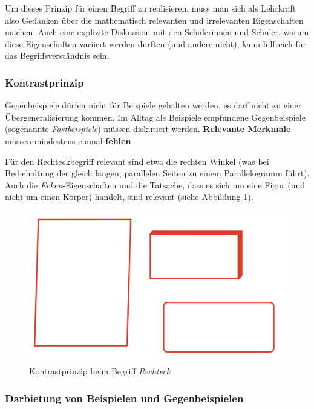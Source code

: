 \documentclass[
  ngerman,
]{scrbook}
\theoremstyle{definition}
\theoremstyle{definition}
\theoremstyle{definition}
\theoremstyle{definition}
\theoremstyle{remark}
\begin{document}
Um dieses Prinzip für einen Begriff zu realisieren, muss man sich als Lehrkraft also Gedanken über die mathematisch relevanten und irrelevanten Eigenschaften machen. Auch eine explizite Diskussion mit den Schülerinnen und Schüler, warum diese Eigenschaften variiert werden durften (und andere nicht), kann hilfreich für das Begriffsverständnis sein.

\hypertarget{kontrastprinzip}{%
\subsubsection{Kontrastprinzip}\label{kontrastprinzip}}

Gegenbeispiele dürfen nicht für Beispiele gehalten werden, es darf nicht zu einer Übergeneralisierung kommen. Im Alltag als Beispiele empfundene Gegenbeispiele (sogenannte \emph{Fastbeispiele}) müssen diskutiert werden. \textbf{Relevante Merkmale} müssen mindestens einmal \textbf{fehlen}.

Für den Rechteckbegriff relevant sind etwa die rechten Winkel (was bei Beibehaltung der gleich langen, parallelen Seiten zu einem Parallelogramm führt). Auch die \emph{Ecken}-Eigenschaften und die Tatsache, dass es sich um eine Figur (und nicht um einen Körper) handelt, sind relevant (siehe Abbildung \ref{fig:KontrasRechteck}).



\begin{figure}

{\centering \includegraphics[width=0.5\linewidth]{pictures/6-Kontrast} 

}

\caption{Kontrastprinzip beim Begriff \emph{Rechteck}}\label{fig:KontrasRechteck}
\end{figure}

\hypertarget{darbietung-von-beispielen-und-gegenbeispielen}{%
\subsubsection{Darbietung von Beispielen und Gegenbeispielen}\label{darbietung-von-beispielen-und-gegenbeispielen}}
\end{document}
